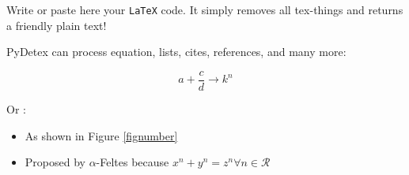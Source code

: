 Write or paste here your \texttt{LaTeX} code. It simply removes all tex-things and returns a friendly plain text! %

PyDetex can process equation, lists, cites, references, and many more:

\begin{equation}
   a + \frac{c}{d} \longrightarrow k^n
\end{equation}

Or :

\begin{itemize}[font=\bfseries]
   \item As shown in Figure \ref{fignumber}
   \item Proposed by $\alpha$-Feltes \cite{feltes2008} because $x^n + y^n = z^n \forall n \in \mathcal{R}$
\end{itemize}